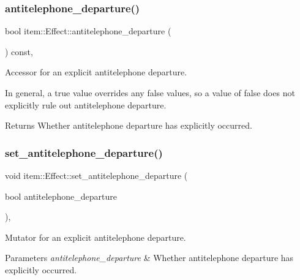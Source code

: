 \subsubsection{\texorpdfstring{antitelephone\+\_\+departure()}{antitelephone\_departure()}}
{\footnotesize\ttfamily bool item\+::\+Effect\+::antitelephone\+\_\+departure (\begin{DoxyParamCaption}{ }\end{DoxyParamCaption}) const\hspace{0.3cm}{\ttfamily [inline]}, {\ttfamily [noexcept]}}



Accessor for an explicit antitelephone departure. 

In general, a {\ttfamily true} value overrides any {\ttfamily false} values, so a value of {\ttfamily false} does not explicitly rule out antitelephone departure. \begin{DoxyReturn}{Returns}
Whether antitelephone departure has explicitly occurred. 
\end{DoxyReturn}
\mbox{\label{classitem_1_1_effect_a209135cb3afb7f25dfd56c5b7c9e2ffd}} 
\subsubsection{\texorpdfstring{set\+\_\+antitelephone\+\_\+departure()}{set\_antitelephone\_departure()}}
{\footnotesize\ttfamily void item\+::\+Effect\+::set\+\_\+antitelephone\+\_\+departure (\begin{DoxyParamCaption}\item[{bool}]{antitelephone\+\_\+departure }\end{DoxyParamCaption})\hspace{0.3cm}{\ttfamily [inline]}, {\ttfamily [noexcept]}}



Mutator for an explicit antitelephone departure. 


\begin{DoxyParams}{Parameters}
{\em antitelephone\+\_\+departure} & Whether antitelephone departure has explicitly occurred. \\
\hline
\end{DoxyParams}
\mbox{\label{classitem_1_1_effect_acb90e76e736868dd5307e8b6fe7e2e0d}} 
